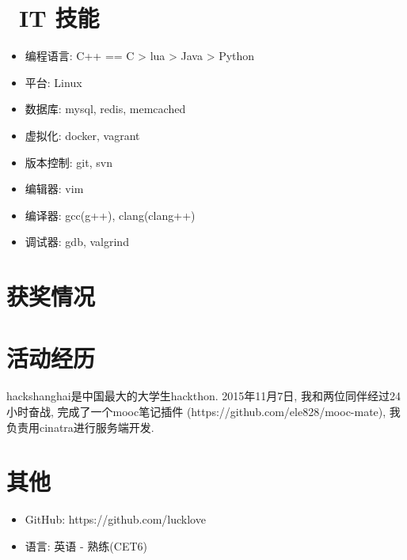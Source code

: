 \documentclass{resume}
\begin{document}
\begin{multicols}{2}
\section{\faCogs\ IT 技能}
\begin{itemize}[parsep=0.5ex]
  \item 编程语言: C++ == C > lua > Java > Python
  \item 平台: Linux
  \item 数据库: mysql, redis, memcached
  \item 虚拟化: docker, vagrant
  \item 版本控制: git, svn
  \item 编辑器: vim
  \item 编译器: gcc(g++), clang(clang++)
  \item 调试器: gdb, valgrind
\end{itemize}

\section{\faHeartO 获奖情况}

\section{\faUsers 活动经历}
hackshanghai是中国最大的大学生hackthon. 
2015年11月7日, 我和两位同伴经过24小时奋战, 
完成了一个mooc笔记插件
(https://github.com/ele828/mooc-mate),
我负责用cinatra进行服务端开发. 

\section{\faInfo 其他}
\begin{itemize}[parsep=0.5ex]
  \item GitHub: https://github.com/lucklove
  \item 语言: 英语 - 熟练(CET6)
\end{itemize}

\end{multicols} %

%
%
\end{document}
